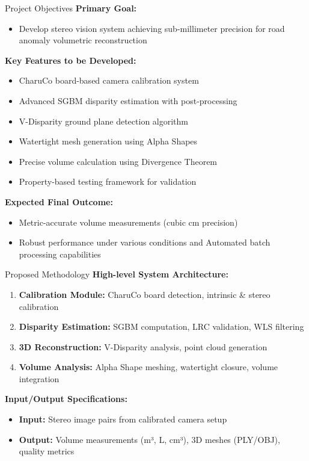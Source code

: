 \documentclass[aspectratio=169]{beamer}
\begin{document}
\begin{frame}{Project Objectives}
\textbf{Primary Goal:}
\begin{itemize}
\item Develop stereo vision system achieving sub-millimeter precision for road anomaly volumetric reconstruction
\end{itemize}

\vspace{0.5cm}

\textbf{Key Features to be Developed:}
\begin{itemize}
\item CharuCo board-based camera calibration system
\item Advanced SGBM disparity estimation with post-processing
\item V-Disparity ground plane detection algorithm
\item Watertight mesh generation using Alpha Shapes
\item Precise volume calculation using Divergence Theorem
\item Property-based testing framework for validation
\end{itemize}

\vspace{0.5cm}

\textbf{Expected Final Outcome:}
\begin{itemize}
\item Metric-accurate volume measurements (cubic cm precision)
\item Robust performance under various conditions and Automated batch processing capabilities
\end{itemize}
\end{frame}

\begin{frame}{Proposed Methodology}
\textbf{High-level System Architecture:}
\begin{enumerate}
\item \textbf{Calibration Module:} CharuCo board detection, intrinsic \& stereo calibration
\item \textbf{Disparity Estimation:} SGBM computation, LRC validation, WLS filtering
\item \textbf{3D Reconstruction:} V-Disparity analysis, point cloud generation
\item \textbf{Volume Analysis:} Alpha Shape meshing, watertight closure, volume integration
\end{enumerate}

\vspace{0.5cm}

\textbf{Input/Output Specifications:}
\begin{itemize}
\item \textbf{Input:} Stereo image pairs from calibrated camera setup
\item \textbf{Output:} Volume measurements (m³, L, cm³), 3D meshes (PLY/OBJ), quality metrics
\end{itemize}
\end{frame}
\end{document}
